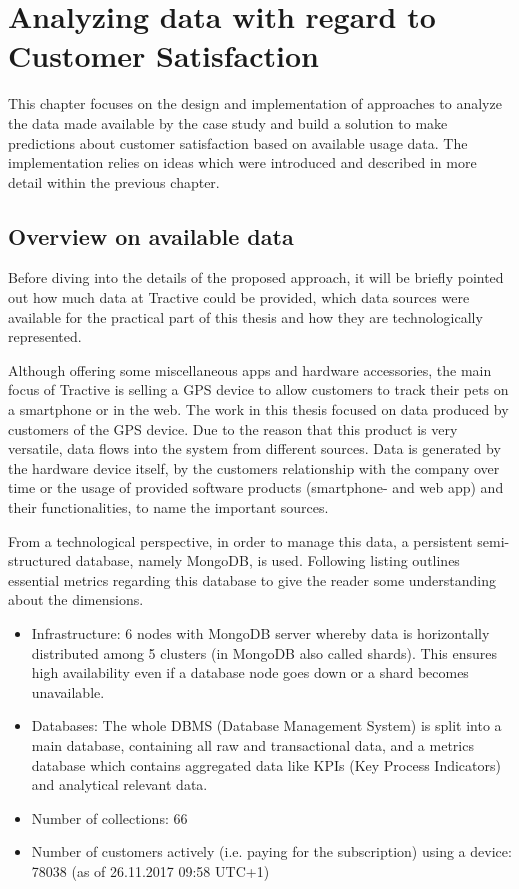 \chapter{Analyzing  data with regard to Customer Satisfaction}
\label{ch:implementation}

This chapter focuses on the design and implementation of approaches to analyze the data made available by the case study and build a solution to make predictions about customer satisfaction based on available usage data. The implementation relies on ideas which were introduced and described in more detail within the previous chapter. 

\section{Overview on available data}
Before diving into the details of the proposed approach, it will be briefly pointed out how much data at Tractive could be provided, which data sources were available for the practical part of this thesis and how they are technologically represented. 

Although offering some miscellaneous apps and hardware accessories, the main focus of Tractive is selling a GPS device to allow customers to track their pets on a smartphone or in the web. The work in this thesis focused on data produced by customers of the GPS device. Due to the reason that this product is very versatile, data flows into the system from different sources. Data is generated by the hardware device itself, by the customers relationship with the company over time or the usage of provided software products (smartphone- and web app) and their functionalities, to name the important sources.

From a technological perspective, in order to manage this data, a persistent semi-structured database, namely MongoDB, is used. Following listing outlines essential metrics regarding this database to give the reader some understanding about the dimensions.

\begin{itemize}
	\item Infrastructure: 6 nodes with MongoDB server whereby data is horizontally distributed among 5 clusters (in MongoDB also called shards). This ensures high availability even if a database node goes down or a shard becomes unavailable.
	\item Databases: The whole DBMS (Database Management System) is split into a main database, containing all raw and transactional data, and a metrics database which contains aggregated data like KPIs (Key Process Indicators) and analytical relevant data. 
	\item Number of collections: 66
	\item Number of customers actively (i.e. paying for the subscription) using a device: 78038 (as of 26.11.2017 09:58 UTC+1)
\end{itemize}


